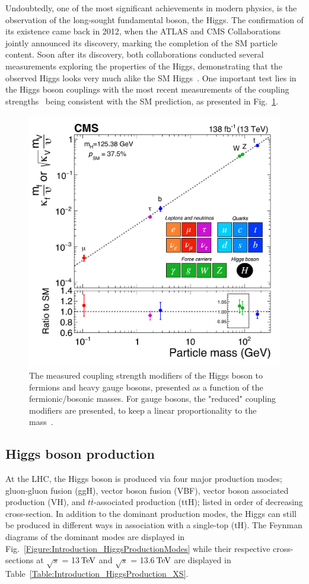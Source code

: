 Undoubtedly, one of the most significant achievements in modern physics, is the observation of the long-sought fundamental boson, the Higgs. The confirmation of its existence came back in 2012, when the ATLAS and CMS Collaborations~\cite{Higgs_ATLAS,Higgs_CMS} jointly announced its discovery, marking the completion of the SM particle content. Soon after its discovery, both collaborations conducted several measurements exploring the properties of the Higgs, demonstrating that the observed Higgs looks very much alike the SM Higgs~\cite{HiggsParity_1,HiggsParity_2}. One important test lies in the Higgs boson couplings with the most recent measurements of the coupling strengths~\cite{CMS_Couplings_Measurement} being consistent with the SM prediction, as presented in Fig.~\ref{Figure:Introduction_CMScouplings}.

\begin{figure}[h]
\centering
\includegraphics[width= .7\textwidth]{Figures/Introduction/CMS_Higgs_FermionCouplings.pdf}
\caption{The measured coupling strength modifiers of the Higgs boson to fermions and heavy gauge bosons, presented as a function of the fermionic/bosonic masses. For gauge bosons, the "reduced" coupling modifiers are presented, to keep a linear proportionality to the mass~\cite{CMS_Couplings_Measurement}.}
\label{Figure:Introduction_CMScouplings}
\end{figure}

\subsection{Higgs boson production}

At the \ac{LHC}, the Higgs boson is produced via four major production modes; gluon-gluon fusion (ggH), vector boson fusion (VBF), vector boson associated production (VH), and $t\overline{t}$-associated production (ttH); listed in order of decreasing cross-section. In addition to the dominant production modes, the Higgs can still be produced in different ways \eg in association with a single-top (tH). The Feynman diagrams of the dominant modes are displayed in Fig.~\ref{Figure:Introduction_HiggsProductionModes} while their respective cross-sections at $\sqrt{s}$ = 13$\,\text{Te\hspace{-.08em}V}$ and $\sqrt{s}$ = 13.6$\,\text{Te\hspace{-.08em}V}$ are displayed in Table~\ref{Table:Introduction_HiggsProduction_XS}. 


